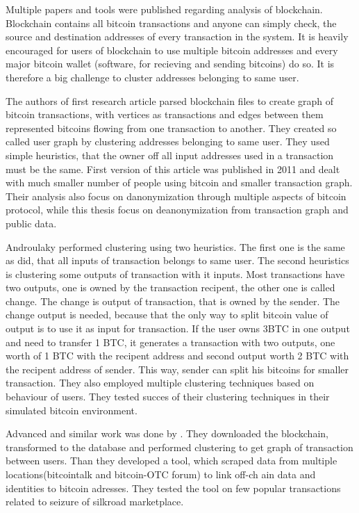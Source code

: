\documentclass[
  digital, %
  table,   %
  lof,     %
  lot,     %
  oneside
]{fithesis3}
\begin{document}
Multiple papers and tools were published regarding analysis of blockchain.
Blockchain contains all bitcoin transactions and anyone can simply check,
the source and destination addresses of every transaction in the system.
It is heavily encouraged for users of blockchain to use multiple bitcoin addresses
 and every major bitcoin wallet (software, for recieving and sending bitcoins) do so.
 It is therefore a big challenge to cluster addresses belonging to same user.
 
The authors of first research article \parencite{reid2013analysis}
 parsed blockchain files to create graph of bitcoin transactions, with vertices as transactions
 and edges between them represented bitcoins flowing from one transaction to another.
 They created so called user graph by clustering addresses belonging to same user.
 They used simple heuristics, that the owner off all input addresses used
 in a transaction must be the same. First version of this article  
was published in 2011 and dealt with much smaller number of people using bitcoin and smaller transaction graph.
Their analysis also focus on danonymization through multiple aspects of bitcoin protocol,
while this thesis focus on deanonymization from transaction graph and public data.

Androulaky \parencite{androulaki2013evaluating} performed clustering using two heuristics.
The first one is the same as \parencite{reid2013analysis} did, that all inputs of transaction
belongs to same user. The second heuristics is clustering some outputs of transaction with it inputs.
Most transactions have two outputs, one is owned by the transaction recipent,
the other one is called change. The change is output of transaction, that is owned by
the sender. The change output is needed, because that the only way to split
 bitcoin value of output is to use it as input for transaction.
 If the user owns 3BTC in one output and need to transfer 1 BTC, it generates a transaction
 with two outputs, one worth of 1 BTC with the recipent address and second output worth 2 BTC 
 with the recipent address of sender. This way, sender can split his bitcoins for smaller transaction.
 They also employed multiple clustering techniques based on behaviour of users.
 They tested succes of their clustering techniques in their simulated bitcoin 
 environment.

Advanced and similar work was done by \parencite{spagnuolo2014bitiodine}. They downloaded the blockchain, transformed to
 the database
and performed clustering to get graph of transaction between users.
Than they developed a tool, which scraped data from multiple locations(bitcointalk and bitcoin-OTC forum) to link off-ch
ain data and identities to bitcoin adresses.
They tested the tool on few popular transactions related to seizure of silkroad marketplace.
\end{document}

